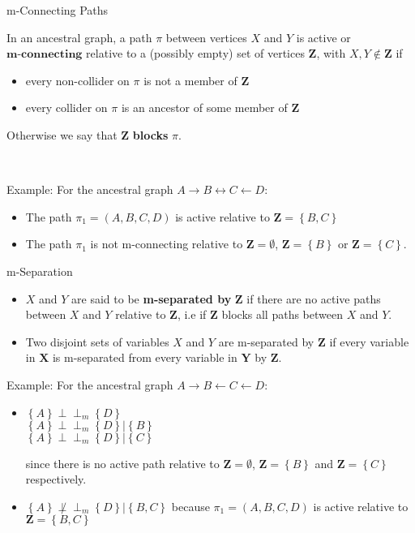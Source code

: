 \documentclass[english, compress, red]{beamer}
\begin{document}
\begin{frame}{m-Connecting Paths}
	\begin{definition}In an ancestral graph, a path $\pi$ between vertices $X$ and $Y$ is active or $\textbf{m-connecting}$ relative to a (possibly empty) set of vertices $\textbf{Z}$, with $X,Y \not \in \mathbf{Z}$ if 
		
		\begin{itemize}
			\item every non-collider on $\pi$ is not a member of $\mathbf{Z}$
			\item every collider on $\pi$ is an ancestor of some member of $\mathbf{Z}$
		\end{itemize}
	Otherwise we say that $\mathbf{Z}$ \textbf{blocks} $\pi$.
	\end{definition}\

Example: For the ancestral graph $A \rightarrow B \leftrightarrow C \leftarrow D$:
\begin{itemize}
	\item The path $\pi_1 = (A,B,C,D)$ is active relative to $\mathbf{Z} = \left\{ B,C \right\}$
	\item The path $\pi_1$ is not m-connecting relative to $\mathbf{Z} = \emptyset$, $\mathbf{Z} = \left\{ B \right\}$ or $\mathbf{Z} = \left\{ C\right\}$.
\end{itemize}
\end{frame}

\begin{frame}{m-Separation}
	\begin{definition}
		\begin{itemize}
			\item $X$ and $Y$ are said to be \textbf{m-separated by} $\mathbf{Z}$ if there are no active paths between $X$ and $Y$ relative to $\mathbf{Z}$, i.e if $\mathbf{Z}$ blocks all paths between $X$ and $Y$.
			\item Two disjoint sets of variables $X$ and $Y$ are m-separated by $\mathbf{Z}$ if every variable in $\mathbf{X}$ is m-separated from every variable in $\mathbf{Y}$ by $\mathbf{Z}$.
		\end{itemize}
	\end{definition}
Example: For the ancestral graph $A \rightarrow B \leftarrow C \leftarrow D$:
\begin{itemize}
	\item $\left\{ A\right\} \perp\!\!\!\perp_m \left\{ D \right\}$ \\
	$\left\{ A\right\} \perp\!\!\!\perp_m \left\{ D \right\} | \left\{ B \right\}$ \\
	$\left\{ A\right\} \perp\!\!\!\perp_m \left\{ D \right\} | \left\{ C\right\}$ 
	
	since there is no active path relative to $\mathbf{Z} = \emptyset$, $\mathbf{Z} = \left\{ B \right\}$ and $\mathbf{Z} = \left\{ C \right\}$ respectively.
	
	\item $\left\{ A\right\} \not \perp\!\!\!\perp_m \left\{ D \right\} | \left\{ B, C\right\}$ because $\pi_1 = (A,B,C,D)$ is active relative to $\mathbf{Z} = \left\{ B,C \right\}$
\end{itemize}
\end{frame}
\end{document}
